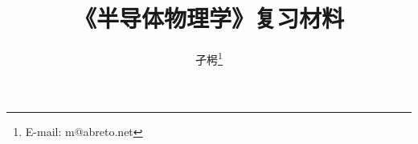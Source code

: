 \documentclass[UTF8]{ctexbook}
\begin{document}
\graphicspath{{figures/}}
\title{《半导体物理学》复习材料}
\author{孑枵\thanks{E-mail: m@abreto.net}}
\frontmatter
\maketitle

\tableofcontents

\mainmatter


\end{document}

